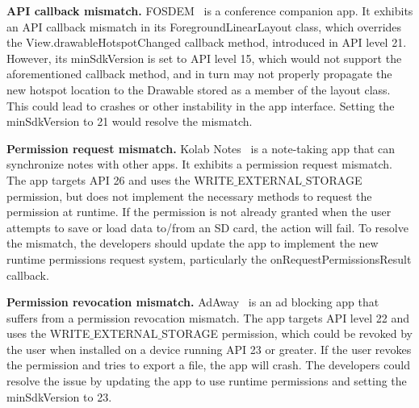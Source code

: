 \textbf{API callback mismatch.} FOSDEM~\cite{fosdem} is a
conference companion app.  It exhibits an API callback
mismatch in its \textsf{ForegroundLinearLayout} class, which
overrides the \textsf{View.drawableHotspotChanged} callback
method, introduced in API level 21. However, its
\textsf{minSdkVersion} is set to API level 15, which would
not support the aforementioned callback method, and in turn
may not properly propagate the new hotspot location to the
\textsf{Drawable} stored as a member of the layout class.
This could lead to crashes or other instability in the app
interface. Setting the \textsf{minSdkVersion} to 21 would
resolve the mismatch.




\textbf{Permission request mismatch.} \textsf{Kolab
Notes}~\cite{kolab} is a note-taking app that can
synchronize notes with other apps.  It exhibits a permission
request mismatch. The app targets API 26 and uses the
\textsf{WRITE}$\_$\textsf{EXTERNAL}$\_$\textsf{STORAGE}
permission, but does not implement the necessary methods to
request the permission at runtime. If the permission is not
already granted when the user attempts to save or load data
to/from an SD card, the action will fail. To resolve the
mismatch, the developers should update the app to implement
the new runtime permissions request system, particularly the
\textsf{onRequestPermissionsResult} callback.

\textbf{Permission revocation mismatch.}
\textsf{AdAway}~\cite{adaway} is an ad blocking app that
suffers from a permission revocation mismatch. The app
targets API level 22 and uses the
\textsf{WRITE}$\_$\textsf{EXTERNAL}$\_$\textsf{STORAGE}
permission, which could be revoked by the user when
installed on a device running API 23 or greater. If the user
revokes the permission and tries to export a file, the app
will crash. The developers could resolve the issue by
updating the app to use runtime permissions and setting the
\textsf{minSdkVersion} to 23.





